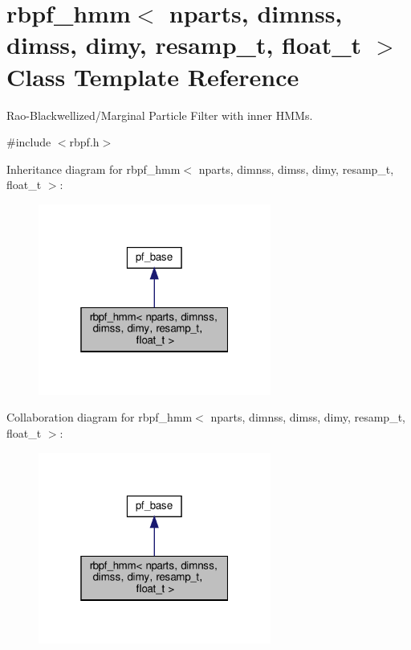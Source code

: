\hypertarget{classrbpf__hmm}{}\section{rbpf\+\_\+hmm$<$ nparts, dimnss, dimss, dimy, resamp\+\_\+t, float\+\_\+t $>$ Class Template Reference}
\label{classrbpf__hmm}


Rao-\/\+Blackwellized/\+Marginal Particle Filter with inner H\+M\+Ms.  




{\ttfamily \#include $<$rbpf.\+h$>$}



Inheritance diagram for rbpf\+\_\+hmm$<$ nparts, dimnss, dimss, dimy, resamp\+\_\+t, float\+\_\+t $>$\+:
\nopagebreak
\begin{figure}[H]
\begin{center}
\leavevmode
\includegraphics[width=217pt]{classrbpf__hmm__inherit__graph}
\end{center}
\end{figure}


Collaboration diagram for rbpf\+\_\+hmm$<$ nparts, dimnss, dimss, dimy, resamp\+\_\+t, float\+\_\+t $>$\+:
\nopagebreak
\begin{figure}[H]
\begin{center}
\leavevmode
\includegraphics[width=217pt]{classrbpf__hmm__coll__graph}
\end{center}
\end{figure}
